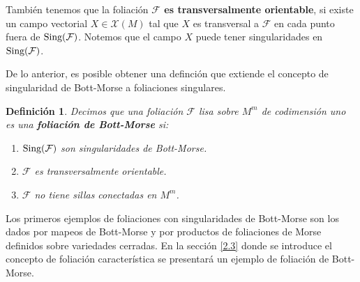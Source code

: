 \documentclass[a4paper,10pt]{book}
\newtheorem{definicion}{Definici\'on}[chapter]
\begin{document}
Tambi\'en tenemos que la foliaci\'on {\bfseries $\mathcal{F}$ es transversalmente orientable}, si existe un campo vectorial $X \in\mathcal{X} (M)$ tal que $X$ es transversal a $\mathcal{F}$ en cada punto fuera de ${\rm Sing(\mathcal{F})}$. Notemos que el campo $X$ puede tener singularidades en ${\rm Sing(\mathcal{F})}$.
\vspace{5mm}

De lo anterior, es posible obtener una definci\'on que extiende el concepto de singularidad de Bott-Morse a foliaciones singulares.
\begin{definicion}
Decimos que una foliaci\'on $\mathcal{F}$ lisa sobre $M^{m}$ de codimensi\'on uno es una {\bfseries foliaci\'on de Bott-Morse} si:
    \begin{enumerate}
        \item ${\rm Sing(\mathcal{F})}$ son singularidades de Bott-Morse.
        \item $\mathcal{F}$ es transversalmente orientable.
        \item $\mathcal{F}$ no tiene sillas conectadas en $M^{m}$.
    \end{enumerate}
\end{definicion}

Los primeros ejemplos de foliaciones con singularidades de Bott-Morse son los dados por mapeos de Bott-Morse y por productos de foliaciones de Morse definidos sobre variedades cerradas. En la secci\'on \ref{2.3} donde se introduce el concepto de foliaci\'on caracter\'istica se presentar\'a un ejemplo de foliaci\'on de Bott-Morse.\\     
\end{document}
